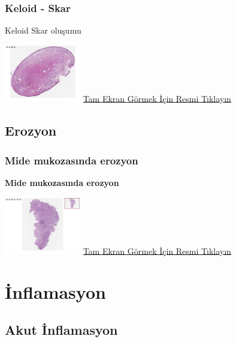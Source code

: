 \documentclass[
  letterpaper,
  DIV=11,
  numbers=noendperiod]{scrreprt}
\begin{document}
\hypertarget{sec-keloid-skar}{%
\section{Keloid - Skar}\label{sec-keloid-skar}}

Keloid Skar oluşumu

\href{https://images.patolojiatlasi.com/keloid-scar/HE.html}{\includegraphics[width=0.25\textwidth,height=\textheight]{./screenshots/keloid-scar_screenshot.png}}
\href{https://images.patolojiatlasi.com/keloid-scar/HE.html}{Tam Ekran
Görmek İçin Resmi Tıklayın}

\hypertarget{sec-erozyon}{%
\chapter{Erozyon}\label{sec-erozyon}}

\hypertarget{sec-mide-mukozasinda-erozyon}{%
\section{Mide mukozasında erozyon}\label{sec-mide-mukozasinda-erozyon}}

\textbf{Mide mukozasında erozyon}

\href{https://images.patolojiatlasi.com/erosion/HE.html}{\includegraphics[width=0.25\textwidth,height=\textheight]{./screenshots/erosion_screenshot.png}}
\href{https://images.patolojiatlasi.com/erosion/HE.html}{Tam Ekran
Görmek İçin Resmi Tıklayın}

\part{İnflamasyon}

\hypertarget{sec-akut-inflamasyon}{%
\chapter{Akut İnflamasyon}\label{sec-akut-inflamasyon}}
\end{document}
